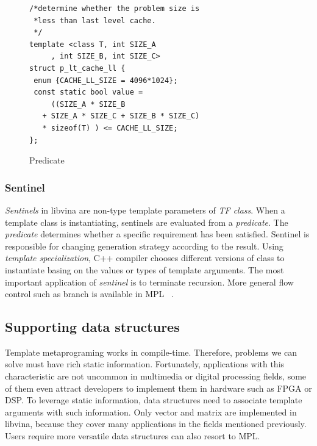 \begin{figure}[!htp]
\begin{minipage}[tb]{\linewidth}
\makebox[\textwidth]{\hrulefill}
\begin{small}
\begin{verbatim}
/*determine whether the problem size is 
 *less than last level cache.
 */
template <class T, int SIZE_A
     , int SIZE_B, int SIZE_C>
struct p_lt_cache_ll {
 enum {CACHE_LL_SIZE = 4096*1024};
 const static bool value = 
     ((SIZE_A * SIZE_B 
   + SIZE_A * SIZE_C + SIZE_B * SIZE_C) 
   * sizeof(T) ) <= CACHE_LL_SIZE;
};
\end{verbatim}
\end{small}
\vspace{-1ex}\makebox[\textwidth]{\hrulefill}
\end{minipage}
\caption{Predicate}\label{lst:pred}
\end{figure}

\subsubsection{Sentinel}
\emph{Sentinels} in libvina are non-type template parameters of
\emph{TF class}. When a template class is instantiating, sentinels are
evaluated from a \emph{predicate}.  The \emph{predicate} determines
whether a specific requirement has been satisfied. Sentinel is
responsible for changing generation strategy according to the
result. Using \emph{template specialization}, C++ compiler chooses
different versions of class to instantiate basing on the values or
types of template arguments. The most important application of
\emph{sentinel} is to  terminate recursion. More general flow control
such as branch is available in MPL ~\cite{mpl}.

\subsection{Supporting data structures}
Template metaprograming works in compile-time. Therefore, problems we can solve must have rich static
information. Fortunately,  applications with this characteristic are
not uncommon in multimedia or digital processing fields, some of them 
even attract developers to implement them in hardware such as FPGA or DSP. To leverage
static information, data structures need to associate template
arguments with such information. Only vector and matrix are implemented in libvina,
because they cover many applications in the fields mentioned
previously. Users require more versatile data structures can also
resort to MPL.

